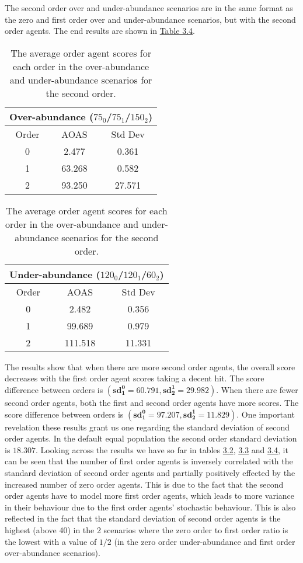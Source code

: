 The second order over and under-abundance scenarios are in the same format as the zero and first order over and under-abundance scenarios, but with the second order agents. The end results are shown in \hyperref[table:non-sig-second-order-simple]{Table 3.4}.

\begin{table}[h]
\centering
\begin{tabular}{|c|c|c|}
\hline
\multicolumn{3}{|c|}{Over-abundance ($75_{0}$/$75_{1}$/$150_{2}$)} \\
\hline
Order & AOAS & Std Dev \\
\hline
0     & 2.477   & 0.361    \\
1     & 63.268  & 0.582    \\
2     & 93.250  & 27.571   \\
\hline
\end{tabular}
\qquad
\begin{tabular}{|c|c|c|}
\hline
\multicolumn{3}{|c|}{Under-abundance ($120_{0}$/$120_{1}$/$60_{2}$)} \\
\hline
Order & AOAS & Std Dev \\
\hline
0     & 2.482   & 0.356   \\
1     & 99.689  & 0.979  \\
2     & 111.518 & 11.331 \\
\hline
\end{tabular}
\caption{The average order agent scores for each order in the over-abundance and under-abundance scenarios for the second order.}
\label{table:non-sig-second-order-simple}
\end{table}

The results show that when there are more second order agents, the overall score decreases with the first order agent scores taking a decent hit. The score difference between orders is $(\mathbf{sd^0_1 = 60.791}, \mathbf{sd^1_2 = 29.982})$. When there are fewer second order agents, both the first and second order agents have more scores. The score difference between orders is $(\mathbf{sd^0_1 = 97.207}, \mathbf{sd^1_2 = 11.829})$. One important revelation these results grant us one regarding the standard deviation of second order agents. In the default equal population the second order standard deviation is $\mathbf{18.307}$. Looking across the results we have so far in tables \hyperref[table:non-sig-zero-order-simple]{3.2}, \hyperref[table:non-sig-first-order-simple]{3.3} and \hyperref[table:non-sig-second-order-simple]{3.4}, it can be seen that the number of first order agents is inversely correlated with the standard deviation of second order agents and partially positively effected by the increased number of zero order agents. This is due to the fact that the second order agents have to model more first order agents, which leads to more variance in their behaviour due to the first order agents' stochastic behaviour. This is also reflected in the fact that the standard deviation of second order agents is the highest (above 40) in the 2 scenarios where the zero order to first order ratio is the lowest with a value of $1/2$ (in the zero order under-abundance and first order over-abundance scenarios). 